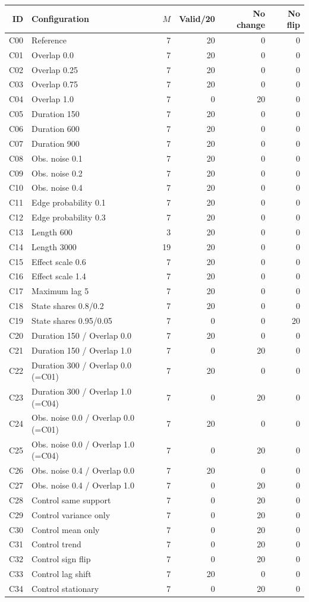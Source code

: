 \begin{tabular}{rlrrrr}
\toprule
ID & Configuration & $M$ & Valid/20 & No change & No flip \\
\midrule
C00 & Reference & 7 & 20 & 0 & 0 \\
C01 & Overlap 0.0 & 7 & 20 & 0 & 0 \\
C02 & Overlap 0.25 & 7 & 20 & 0 & 0 \\
C03 & Overlap 0.75 & 7 & 20 & 0 & 0 \\
C04 & Overlap 1.0 & 7 & 0 & 20 & 0 \\
C05 & Duration 150 & 7 & 20 & 0 & 0 \\
C06 & Duration 600 & 7 & 20 & 0 & 0 \\
C07 & Duration 900 & 7 & 20 & 0 & 0 \\
C08 & Obs. noise 0.1 & 7 & 20 & 0 & 0 \\
C09 & Obs. noise 0.2 & 7 & 20 & 0 & 0 \\
C10 & Obs. noise 0.4 & 7 & 20 & 0 & 0 \\
C11 & Edge probability 0.1 & 7 & 20 & 0 & 0 \\
C12 & Edge probability 0.3 & 7 & 20 & 0 & 0 \\
C13 & Length 600 & 3 & 20 & 0 & 0 \\
C14 & Length 3000 & 19 & 20 & 0 & 0 \\
C15 & Effect scale 0.6 & 7 & 20 & 0 & 0 \\
C16 & Effect scale 1.4 & 7 & 20 & 0 & 0 \\
C17 & Maximum lag 5 & 7 & 20 & 0 & 0 \\
C18 & State shares 0.8/0.2 & 7 & 20 & 0 & 0 \\
C19 & State shares 0.95/0.05 & 7 & 0 & 0 & 20 \\
C20 & Duration 150 / Overlap 0.0 & 7 & 20 & 0 & 0 \\
C21 & Duration 150 / Overlap 1.0 & 7 & 0 & 20 & 0 \\
C22 & Duration 300 / Overlap 0.0 (=C01) & 7 & 20 & 0 & 0 \\
C23 & Duration 300 / Overlap 1.0 (=C04) & 7 & 0 & 20 & 0 \\
C24 & Obs. noise 0.0 / Overlap 0.0 (=C01) & 7 & 20 & 0 & 0 \\
C25 & Obs. noise 0.0 / Overlap 1.0 (=C04) & 7 & 0 & 20 & 0 \\
C26 & Obs. noise 0.4 / Overlap 0.0 & 7 & 20 & 0 & 0 \\
C27 & Obs. noise 0.4 / Overlap 1.0 & 7 & 0 & 20 & 0 \\
C28 & Control same support & 7 & 0 & 20 & 0 \\
C29 & Control variance only & 7 & 0 & 20 & 0 \\
C30 & Control mean only & 7 & 0 & 20 & 0 \\
C31 & Control trend & 7 & 0 & 20 & 0 \\
C32 & Control sign flip & 7 & 0 & 20 & 0 \\
C33 & Control lag shift & 7 & 20 & 0 & 0 \\
C34 & Control stationary & 7 & 0 & 20 & 0 \\
\bottomrule
\end{tabular}
